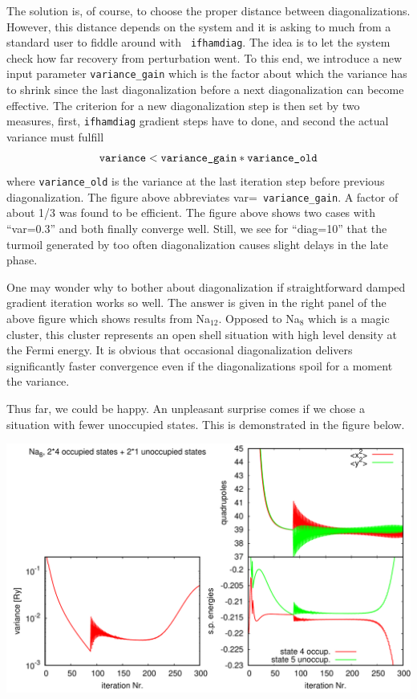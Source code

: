 \documentclass[12pt,a4paper]{article}
\begin{document}
The solution is, of course, to choose the proper distance between
diagonalizations. However, this distance depends on the system and it
is asking to much from a standard user to fiddle around with {\tt
  ifhamdiag}. The idea is to let the system check how far recovery
from perturbation went. To this end, we introduce a new input
parameter {\tt variance\_gain} which is the factor about which the
variance has to shrink since the last diagonalization before a
next diagonalization can become effective. The criterion for 
a new diagonalization step is then set by two measures,
first, {\tt ifhamdiag} gradient steps have to done, and second
the actual variance must fulfill
\begin{equation}
  \mbox{\tt variance}
  <
  \mbox{\tt variance\_gain}*\mbox{\tt variance\_old}
\end{equation}
where {\tt variance\_old} is the variance at the last iteration step
before previous diagonalization. The figure above abbreviates var={\tt
  variance\_gain}. A factor of about 1/3 was found to be efficient.
The figure above shows two cases with ``var=0.3'' and both finally
converge well. Still, we see for ``diag=10'' that the turmoil
generated by too often diagonalization causes slight delays in the late
phase.

One may wonder why to bother about diagonalization if straightforward
damped gradient iteration works so well. The answer is given in the
right panel of the above figure which shows results from Na$_{12}$.
Opposed to Na$_8$ which is a magic cluster, this cluster represents an
open shell situation with high level density at the Fermi energy.  It
is obvious that occasional diagonalization delivers significantly
faster convergence even if the diagonalizations spoil for a moment the
variance.

Thus far, we could be happy. An  unpleasant surprise comes if we
chose a situation with fewer unoccupied states. This is demonstrated
in the figure below.


\bigskip

\centerline{\includegraphics[width=\linewidth]{unstable_iteration.pdf}}
\end{document}
